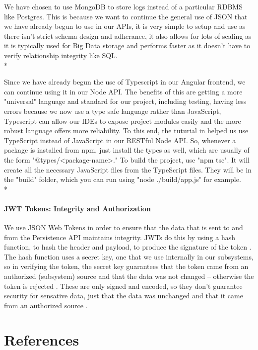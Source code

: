 \documentclass[11pt]{article}
\begin{document}
We have chosen to use MongoDB to store logs instead of a particular RDBMS like Postgres. This is because we want to continue the general use of JSON that we have already begun to use in our APIs, it is very simple to setup and use\cite{Website:10} as there isn't strict schema design and adherance\cite{Website:11}, it also allows for lots of scaling\cite{Website:10} as it is typically used for Big Data storage\cite{Website:12} and performs faster as it doesn't have to verify relationship integrity like SQL\cite{Website:11}.\\*

Since we have already begun the use of Typescript in our Angular frontend, we can continue using it in our Node API. The benefits of this are getting a more "universal" language and standard for our project, including testing, having less errors because we now use a type safe language rather than JavaScript, Typescript can allow our IDEs to expose project modules easily and the more robust language offers more reliability\cite{Website:9}. To this end, the tuturial in \cite{Website:9} helped us use TypeScript instead of JavaScript in our RESTful Node API. So, whenever a package is installed from npm, just install the types as well, which are usually of the form "@types/<package-name>." To build the project, use "npm tsc". It will create all the necessary JavaScript files from the TypeScript files. They will be in the "build" folder, which you can run using "node ./build/app.js" for example.\\*

\paragraph{JWT Tokens: Integrity and Authorization}

We use JSON Web Tokens in order to ensure that the data that is sent to and from the Persistence API maintains integrity. JWTs do this by using a hash function, to hash the header and payload, to produce the signature of the token \cite{Website:13}. The hash function uses a secret key, one that we use internally in our subsystems, so in verifying the token, the secret key guarantees that the token came from an authorized (subsystem) source and that the data was not changed -- otherwise the token is rejected \cite{Website: 13}. These are only signed and encoded, so they don't guarantee security for sensative data, just that the data was unchanged and that it came from an authorized source \cite{Website: 14}.

\section{References}


\end{document}
